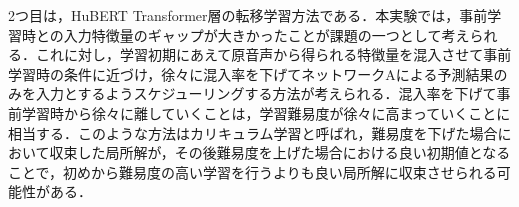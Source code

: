 2つ目は，HuBERT Transformer層の転移学習方法である．本実験では，事前学習時との入力特徴量のギャップが大きかったことが課題の一つとして考えられる．これに対し，学習初期にあえて原音声から得られる特徴量を混入させて事前学習時の条件に近づけ，徐々に混入率を下げてネットワークAによる予測結果のみを入力とするようスケジューリングする方法が考えられる．混入率を下げて事前学習時から徐々に離していくことは，学習難易度が徐々に高まっていくことに相当する．このような方法はカリキュラム学習と呼ばれ，難易度を下げた場合において収束した局所解が，その後難易度を上げた場合における良い初期値となることで，初めから難易度の高い学習を行うよりも良い局所解に収束させられる可能性がある\cite{wang2021survey}．
